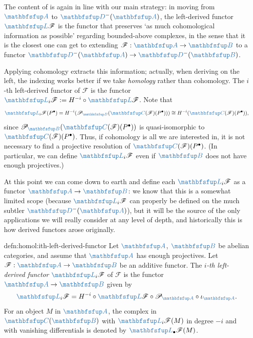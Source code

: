The content of  is again in line with
our main strategy: in moving from $\categ{A}$ to $\categ{D}^-(\categ{A})$, the
left-derived functor $\categ{L}\mathscr{F}$ is the functor that preserves `as much
cohomological information as possible' regarding bounded-above
complexes, in the sense that it is the closest one can get to
extending $\mathscr{F} : \categ{A} \to \categ{B}$ to a functor
$\categ{D}^-(\categ{A}) \to \categ{D}^-(\categ{B})$.

Applying cohomology extracts this information; actually, when deriving
on the left, the indexing works better if we take \emph{homology}
rather than cohomology. The $i$-th left-derived functor of
$\mathscr{F}$ is the functor
$\categ{L}_i\mathscr{F} := H^{-i} \circ \categ{L}\mathscr{F}$. Note
that
\[
  \categ{L}_i\mathscr{F}(P^\bullet) = H^{-i}(\mathscr{P}_{\categ{B}}
  (\categ{C}(\mathscr{F})(P^\bullet))) \cong
  H^{-i}(\categ{C}(\mathscr{F})(P^\bullet)),
\]
since $\mathscr{P}_{\categ{B}}(\categ{C}(\mathscr{F})(P^\bullet))$ is
quasi-isomorphic to $\categ{C}(\mathscr{F})(P^\bullet)$. Thus, if
cohomology is all we are interested in, it is not necessary to find a
projective resolution of $\categ{C}(\mathscr{F})(P^\bullet)$. (In
particular, we can define $\categ{L}_i\mathscr{F}$ even if $\categ{B}$
does not have enough projectives.)

At this point we can come down to earth and define each
$\categ{L}_i\mathscr{F}$ as a functor $\categ{A} \to \categ{B}$: we
know that this is a somewhat limited scope (because
$\categ{L}_i\mathscr{F}$ can properly be defined on the much subtler
$\categ{D}^-(\categ{A})$), but it will be the source of the only
applications we will really consider at any level of depth, and
historically this is how derived functors arose originally.

\begin{defn}{}{defn:homol:ith-left-derived-functor}
  Let $\categ{A}$, $\categ{B}$ be abelian categories, and assume that
  $\categ{A}$ has enough projectives. Let
  $\mathscr{F} : \categ{A} \to \categ{B}$ be an additive functor. The
  \emph{$i$-th left-derived functor} $\categ{L}_i\mathscr{F}$ of
  $\mathscr{F}$ is the functor $\categ{A} \to \categ{B}$ given by
  \[
    \categ{L}_i\mathscr{F} = H^{-i} \circ \categ{L}\mathscr{F} \circ
    \mathscr{P}_{\categ{A}} \circ \iota_{\categ{A}}.
  \]
  For an object $M$ in $\categ{A}$, the complex in
  $\categ{C}(\categ{B})$ with $\categ{L}_i\mathscr{F}(M)$ in degree
  $-i$ and with vanishing differentials is denoted by
  $\categ{L}_\bullet\mathscr{F}(M)$.
\end{defn}

